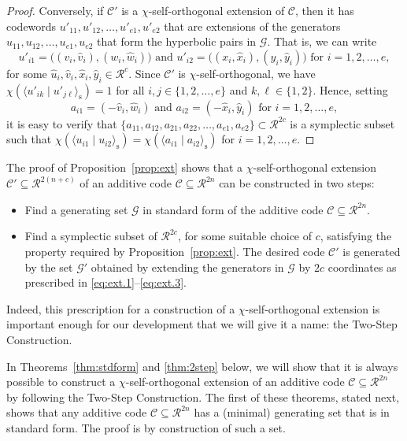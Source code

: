\documentclass{article}
\theoremstyle{remark}
\theoremstyle{definition}
\numberwithin{equation}{section}
\begin{document}
\begin{proof}
Conversely, if $\mathcal{C}'$ is a $\chi$-self-orthogonal extension of $\mathcal{C}$, then it has codewords $u'_{11},u'_{12},\ldots,u'_{e1},u'_{e2}$ that are extensions of the generators $u_{11},u_{12},\ldots,u_{e1},u_{e2}$ that form the hyperbolic pairs in $\mathcal{G}$. That is, we can write
 $$
 u'_{i1} = \bigl((v_i,\hat{v}_i),(w_i,\hat{w}_i)\bigr) \text{ and }  u'_{i2} = \bigl((x_i,\hat{x}_i),(y_i,\hat{y}_i)\bigr) \text{ for } i = 1,2,\ldots,e,
 $$
for some $\hat{u}_i,\hat{v}_i,\hat{x}_i,\hat{y}_i \in \mathcal{R}^c$. Since $\mathcal{C}'$ is $\chi$-self-orthogonal, we have $\chi(\langle u'_{ik} \mid u'_{j\ell}\rangle_{\mathrm{s}}) = 1$ for all $i,j \in \{1,2,\ldots,e\}$ and $k, \ell \in \{1,2\}$. Hence, setting
$$
a_{i1} = (-\hat{v}_i,\hat{w}_i) \text{ and } a_{i2} = (-\hat{x}_i,\hat{y}_i) \text{ for } i = 1,2,\ldots,e,
$$
it is easy to verify that  $\{a_{11},a_{12},a_{21},a_{22},\ldots,a_{e1},a_{e2}\} \subset \mathcal{R}^{2c}$ is a symplectic subset such that $\chi(\langle u_{i1} \mid u_{i2} \rangle_{\mathrm{s}}) = \chi(\langle a_{i1} \mid a_{i2} \rangle_{\mathrm{s}})$ for $i=1,2,\ldots,e$. 
 \end{proof}

The proof of Proposition~\ref{prop:ext} shows that a $\chi$-self-orthogonal extension $\mathcal{C}' \subseteq \mathcal{R}^{2(n+c)}$ of an additive code $\mathcal{C} \subseteq \mathcal{R}^{2n}$ can be constructed in two steps:
\begin{itemize}
\item[(1)] Find a generating set $\mathcal{G}$ in standard form of the additive code $\mathcal{C} \subseteq \mathcal{R}^{2n}$.
\item[(2)] Find a symplectic subset of $\mathcal{R}^{2c}$, for some suitable choice of $c$, satisfying the property required by Proposition~\ref{prop:ext}. The desired code $\mathcal{C}'$ is generated by the set $\mathcal{G}'$ obtained by extending the generators in $\mathcal{G}$ by $2c$ coordinates as prescribed in \eqref{eq:ext.1}--\eqref{eq:ext.3}. 
\end{itemize}   
Indeed, this prescription for a construction of a $\chi$-self-orthogonal extension is important enough for our development that we will give it a name: the Two-Step Construction. 

In Theorems~\ref{thm:stdform} and \ref{thm:2step} below, we will show that it is always possible to construct a $\chi$-self-orthogonal extension of an additive code $\mathcal{C} \subseteq \mathcal{R}^{2n}$ by following the Two-Step Construction. The first of these theorems, stated next, shows that any additive code $\mathcal{C} \subseteq \mathcal{R}^{2n}$ has a (minimal) generating set that is in standard form. The proof is by construction of such a set.
\end{document}
